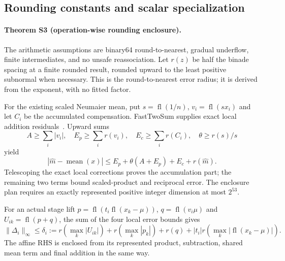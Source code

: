 \subsection{Rounding constants and scalar specialization}
\paragraph{Theorem S3 (operation-wise rounding enclosure).}
The arithmetic assumptions are binary64 round-to-nearest, gradual underflow, finite intermediates, and no unsafe reassociation. Let $r(z)$ be half the binade spacing at a finite rounded result, rounded upward to the least positive subnormal when necessary. This is the round-to-nearest error radius; it is derived from the exponent, with no fitted factor.

For the existing scaled Neumaier mean, put $s=\operatorname{fl}(1/n)$, $v_i=\operatorname{fl}(s x_i)$ and let $C_i$ be the accumulated compensation. FastTwoSum supplies exact local addition residuals~\cite{OgitaRumpOishi2005}. Upward sums
\begin{equation}
 A\ge\sum_i|v_i|,\quad E_p\ge\sum_i r(v_i),\quad
 E_c\ge\sum_i r(C_i),\quad \theta\ge r(s)/s
\end{equation}
yield
\begin{equation}
 |\widehat m-\operatorname{mean}(x)|
 \le E_p+\theta(A+E_p)+E_c+r(\widehat m).
\end{equation}
Telescoping the exact local corrections proves the accumulation part; the remaining two terms bound scaled-product and reciprocal error. The enclosure plan requires an exactly represented positive integer dimension at most $2^{53}$.

For an actual stage lift
$p=\operatorname{fl}(t_i\operatorname{fl}(x_k-\mu))$,
$q=\operatorname{fl}(v_i\mu)$ and
$U_{ik}=\operatorname{fl}(p+q)$, the sum of the four local error bounds gives
\begin{equation}
 \|\Delta_i\|_\infty\le\delta_i:=r(\max_k|U_{ik}|)+r(\max_k|p_k|)+r(q)
 +|t_i|r(\max_k|\operatorname{fl}(x_k-\mu)|).
\end{equation}
The affine RHS is enclosed from its represented product, subtraction, shared mean term and final addition in the same way.

